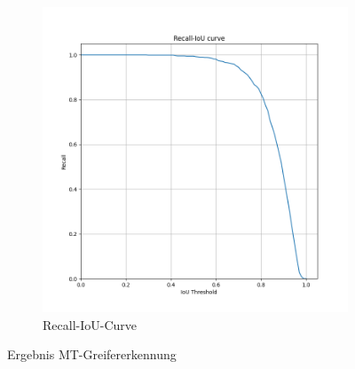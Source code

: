\begin{figure}[h]
\begin{subfigure}[c]{0.32\textwidth}
			\includegraphics[width=1\textwidth, center]{bilder/Hauptteil/MT_Grapple/Recall_IoU.png}
			\caption{Recall-IoU-Curve}
			\label{img:RecalllIoUt_MT}	
		\end{subfigure}
		\caption{Ergebnis MT-Greifererkennung}
		\label{img:ErgebnisRegressionMT}
	\end{figure}

